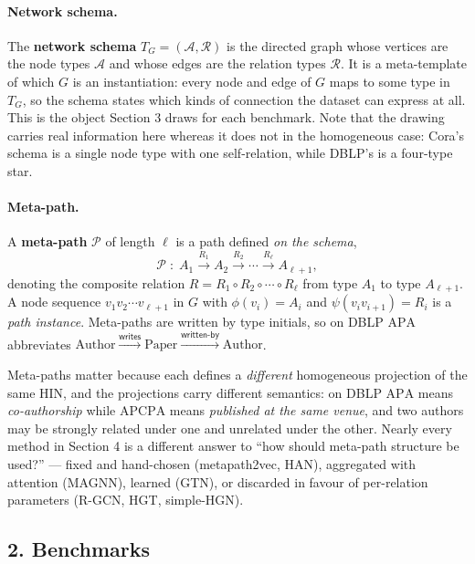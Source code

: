 \paragraph{Network schema.}
The \textbf{network schema} $T_G=(\mathcal{A},\mathcal{R})$ is the directed graph whose vertices
are the node types $\mathcal{A}$ and whose edges are the relation types $\mathcal{R}$. It is a
meta-template of which $G$ is an instantiation: every node and edge of $G$ maps to some type in
$T_G$, so the schema states which kinds of connection the dataset can express at all. This is the
object Section 3 draws for each benchmark. Note that the drawing carries real
information here whereas it does not in the homogeneous case: Cora's schema is a single node type
with one self-relation, while DBLP's is a four-type star.

\paragraph{Meta-path.}
A \textbf{meta-path} $\mathcal{P}$ of length $\ell$ is a path defined \emph{on the schema},
\[
  \mathcal{P}\;:\;A_1\xrightarrow{R_1}A_2\xrightarrow{R_2}\cdots\xrightarrow{R_\ell}A_{\ell+1},
\]
denoting the composite relation $R=R_1\circ R_2\circ\cdots\circ R_\ell$ from type $A_1$ to type
$A_{\ell+1}$. A node sequence $v_1v_2\cdots v_{\ell+1}$ in $G$ with $\phi(v_i)=A_i$ and
$\psi(v_iv_{i+1})=R_i$ is a \emph{path instance}. Meta-paths are written by type initials, so on
DBLP $\mathrm{APA}$ abbreviates
$\text{Author}\xrightarrow{\mathsf{writes}}\text{Paper}\xrightarrow{\mathsf{written\text{-}by}}\text{Author}$.

Meta-paths matter because each defines a \emph{different} homogeneous projection of the same HIN,
and the projections carry different semantics: on DBLP $\mathrm{APA}$ means \emph{co-authorship}
while $\mathrm{APCPA}$ means \emph{published at the same venue}, and two authors may be strongly
related under one and unrelated under the other. Nearly every method in
Section 4 is a different answer to ``how should meta-path structure be
used?'' --- fixed and hand-chosen (metapath2vec, HAN), aggregated with attention (MAGNN), learned
(GTN), or discarded in favour of per-relation parameters (R-GCN, HGT, simple-HGN).

\subsection*{2. Benchmarks}

